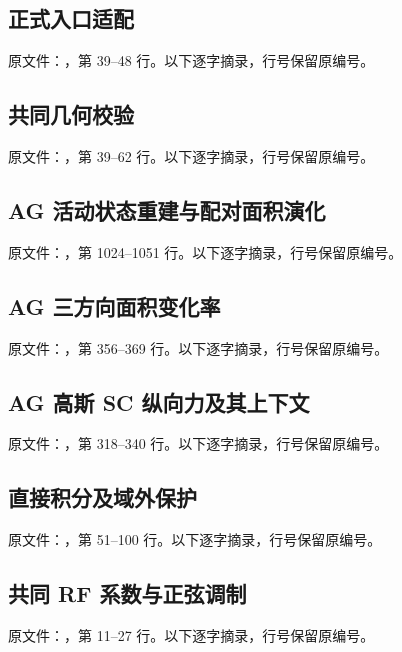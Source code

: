 \subsection{正式入口适配}\label{code:entry}
\noindent 原文件：，第 39--48 行。以下逐字摘录，行号保留原编号。

\subsection{共同几何校验}\label{code:geometry}
\noindent 原文件：，第 39--62 行。以下逐字摘录，行号保留原编号。

\subsection{AG 活动状态重建与配对面积演化}\label{code:state}
\noindent 原文件：，第 1024--1051 行。以下逐字摘录，行号保留原编号。

\subsection{AG 三方向面积变化率}\label{code:g}
\noindent 原文件：，第 356--369 行。以下逐字摘录，行号保留原编号。

\subsection{AG 高斯 SC 纵向力及其上下文}\label{code:force}
\noindent 原文件：，第 318--340 行。以下逐字摘录，行号保留原编号。

\subsection{直接积分及域外保护}\label{code:alpha}
\noindent 原文件：，第 51--100 行。以下逐字摘录，行号保留原编号。

\subsection{共同 RF 系数与正弦调制}\label{code:rfshared}
\noindent 原文件：，第 11--27 行。以下逐字摘录，行号保留原编号。

